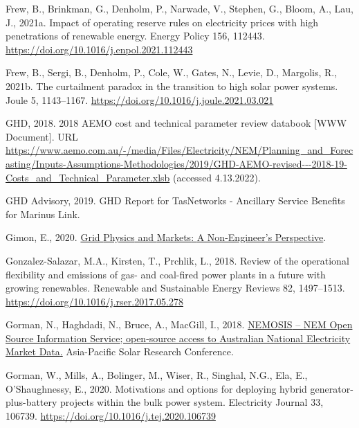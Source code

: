 \documentclass[12pt,a4paper,]{report}
\newlength{\cslhangindent}
\newenvironment{CSLReferences}[2] %
 {%
  \setlength{\parindent}{0pt}
  \ifodd #1 \everypar{\setlength{\hangindent}{\cslhangindent}}\ignorespaces\fi
  \ifnum #2 > 0
  \setlength{\parskip}{#2\baselineskip}
  \fi
 }%
 {}
\begin{document}
\begin{CSLReferences}{1}{0}
\leavevmode{}%
Frew, B., Brinkman, G., Denholm, P., Narwade, V., Stephen, G., Bloom,
A., Lau, J., 2021a. Impact of operating reserve rules on electricity
prices with high penetrations of renewable energy. Energy Policy 156,
112443. \url{https://doi.org/10.1016/j.enpol.2021.112443}

\leavevmode{}%
Frew, B., Sergi, B., Denholm, P., Cole, W., Gates, N., Levie, D.,
Margolis, R., 2021b. The curtailment paradox in the transition to high
solar power systems. Joule 5, 1143--1167.
\url{https://doi.org/10.1016/j.joule.2021.03.021}

\leavevmode{}%
GHD, 2018. 2018 {AEMO} cost and technical parameter review databook
{[}WWW Document{]}. URL
\url{https://www.aemo.com.au/-/media/Files/Electricity/NEM/Planning_and_Forecasting/Inputs-Assumptions-Methodologies/2019/GHD-AEMO-revised---2018-19-Costs_and_Technical_Parameter.xlsb}
(accessed 4.13.2022).

\leavevmode{}%
GHD Advisory, 2019. {GHD Report} for {TasNetworks} - {Ancillary Service
Benefits} for {Marinus Link}.

\leavevmode{}%
Gimon, E., 2020.
\href{https://www.esig.energy/download/plenary-1-grid-physics-and-markets-a-non-engineers-perspective-eric-gimon/}{Grid
{Physics} and {Markets}: {A Non-Engineer}'s {Perspective}}.

\leavevmode{}%
Gonzalez-Salazar, M.A., Kirsten, T., Prchlik, L., 2018. Review of the
operational flexibility and emissions of gas- and coal-fired power
plants in a future with growing renewables. Renewable and Sustainable
Energy Reviews 82, 1497--1513.
\url{https://doi.org/10.1016/j.rser.2017.05.278}

\leavevmode{}%
Gorman, N., Haghdadi, N., Bruce, A., MacGill, I., 2018.
\href{https://www.researchgate.net/publication/329798805}{{NEMOSIS} --
{NEM Open Source Information Service}; open-source access to {Australian
National Electricity Market Data}.} Asia-Pacific Solar Research
Conference.

\leavevmode{}%
Gorman, W., Mills, A., Bolinger, M., Wiser, R., Singhal, N.G., Ela, E.,
O'Shaughnessy, E., 2020. Motivations and options for deploying hybrid
generator-plus-battery projects within the bulk power system.
Electricity Journal 33, 106739.
\url{https://doi.org/10.1016/j.tej.2020.106739}


\end{CSLReferences}
\end{document}
